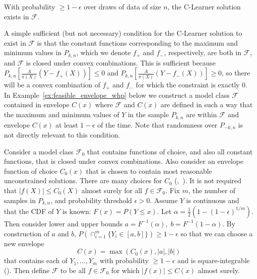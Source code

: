 \begin{assumption}
\label{ass:soln_exists}
With probability $\geq 1-\epsilon$ over draws of data of size $n$, 
the C-Learner solution exists in $\mathcal F$. \end{assumption}
A simple sufficient (but not necessary) condition for the C-Learner solution to exist in $\mathcal F$ is that the constant functions corresponding to the maximum and minimum values in $P_{k,n}$, which we denote $f_+$ and $f_-$, respectively, are both in $\mathcal F$, and $\mathcal F$ is closed under convex combinations. This is sufficient because 
$P_{k,n}\left[\frac{A}{\pi(X)}(Y-f_+(X))\right]\leq 0$ and $P_{k,n}\left[\frac{A}{\pi(X)}(Y-f_-(X))\right]\geq 0$, 
so there will be a convex combination of $f_+$ and $f_-$ for which the constraint is exactly 0. In Example~\ref{ex:feasible_envelope_whp} below we construct a model class $\mathcal F$ contained in envelope $C(x)$ where $\mathcal F$ and $C(x)$ are defined in such a way that the maximum and minimum values of $Y$ in the sample $P_{k,n}$ are within $\mathcal F$ and envelope $C(x)$ at least $1-\epsilon$ of the time. Note that randomness over $P_{-k,n}$ is not directly relevant to this condition. 

\begin{example}
\label{ex:feasible_envelope_whp}
Consider a model class $\mathcal F_0$ that contains functions of choice, and also all constant functions, that is closed under convex combinations. Also consider an envelope function of choice $C_0(x)$ that is chosen to contain most reasonable unconstrained solutions. There are many choices for $C_0$ (,~). It is not required that $|f(X)|\leq C_0(X)$ almost surely for all $f\in \mathcal F_0$. 
Fix $m$, the number of samples in $P_{k,n}$, and probability threshold $\epsilon>0$. 
Assume $Y$ is continuous and that the CDF of $Y$ is known: $F(x)=P(Y\leq x)$. 
Let $\alpha=\frac{1}{2}(1-(1-\epsilon)^{1/m})$. 
Then consider lower and upper bounds
$a=F^{-1}(\alpha), \; b=F^{-1}(1-\alpha).$
By construction of $a$ and $b$, 
$P( \cap_{i=1}^m \{Y_i\in[a,b]\})\geq 1-\epsilon$
so that we can choose a new envelope
$$C(x)=\max(C_0(x), |a|, |b|)$$
that contains each of $Y_1,\ldots,Y_m$ with probability $\geq 1-\epsilon$ and is square-integrable (). 
Then define $\mathcal F$ to be all $f\in\mathcal F_0$ for which $|f(x)|\leq C(x)$ almost surely.
\end{example}

